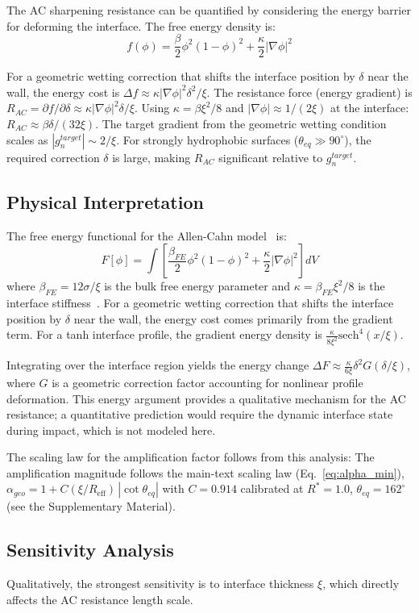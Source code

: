 The AC sharpening resistance can be quantified by considering the energy barrier for deforming the interface. The free energy density is:
\begin{equation}\label{eq:app_free_energy}
    f(\phi) = \frac{\beta}{2} \phi^2(1-\phi)^2 + \frac{\kappa}{2} |\nabla\phi|^2
\end{equation}

For a geometric wetting correction that shifts the interface position by $\delta$ near the wall, the energy cost is $\Delta f \approx \kappa |\nabla\phi|^2 \delta^2 / \xi$. The resistance force (energy gradient) is $R_{AC} = \partial f/\partial \delta \approx \kappa |\nabla\phi|^2 \delta / \xi$. Using $\kappa = \beta\xi^2/8$ and $|\nabla\phi| \approx 1/(2\xi)$ at the interface: $R_{AC} \approx \beta\delta/(32\xi)$. The target gradient from the geometric wetting condition scales as $|g_n^{target}| \sim 2/\xi$. For strongly hydrophobic surfaces ($\theta_{eq} \gg 90^\circ$), the required correction $\delta$ is large, making $R_{AC}$ significant relative to $g_n^{target}$.

\subsection{Physical Interpretation}

The free energy functional for the Allen-Cahn model~\cite{allen1979microscopic, cahn1958free} is:
\begin{equation}\label{eq:app_free_energy_full}
    F[\phi] = \int \left[ \frac{\beta_{FE}}{2} \phi^2(1-\phi)^2 + \frac{\kappa}{2} |\nabla\phi|^2 \right] dV
\end{equation}
where $\beta_{FE} = 12\sigma/\xi$ is the bulk free energy parameter and $\kappa = \beta_{FE}\xi^2/8$ is the interface stiffness~\cite{jacqmin2000contact, lowengrub1998quasi}. For a geometric wetting correction that shifts the interface position by $\delta$ near the wall, the energy cost comes primarily from the gradient term. For a tanh interface profile, the gradient energy density is $\frac{\kappa}{8\xi^2} \text{sech}^4(x/\xi)$.

Integrating over the interface region yields the energy change $\Delta F \approx \frac{\kappa}{6\xi} \delta^2 G(\delta/\xi)$, where $G$ is a geometric correction factor accounting for nonlinear profile deformation. This energy argument provides a qualitative mechanism for the AC resistance; a quantitative prediction would require the dynamic interface state during impact, which is not modeled here.

The scaling law for the amplification factor follows from this analysis:
The amplification magnitude follows the main-text scaling law (Eq.~\ref{eq:alpha_min}), $\alpha_{geo} = 1 + C(\xi/R_{\mathrm{eff}})\,|\cot\theta_{eq}|$ with $C = 0.914$ calibrated at $R^*=1.0$, $\theta_{eq}=162^\circ$ (see the Supplementary Material).

\subsection{Sensitivity Analysis}

 Qualitatively, the strongest sensitivity is to interface thickness $\xi$, which directly affects the AC resistance length scale.
